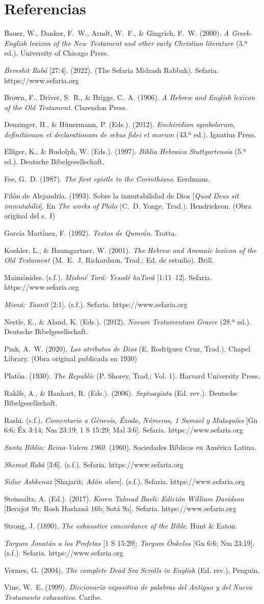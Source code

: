 \documentclass[11pt,letterpaper]{article}
\newcommand{\refapa}[1]{\par{\RaggedRight\hangindent=1.27cm\hangafter=1\noindent #1\par}\vspace{4pt}}
\begin{document}
\section*{Referencias}
\refapa{Bauer, W., Danker, F.~W., Arndt, W.~F., \& Gingrich, F.~W. (2000). \emph{A Greek-English lexicon of the New Testament and other early Christian literature} (3.ª ed.). University of Chicago Press.}
\refapa{\emph{Bereshit Rabá} [27:4]. (2022). (The Sefaria Midrash Rabbah). Sefaria. https://www.sefaria.org}
\refapa{Brown, F., Driver, S.~R., \& Briggs, C.~A. (1906). \emph{A Hebrew and English lexicon of the Old Testament}. Clarendon Press.}
\refapa{Denzinger, H., \& Hünermann, P. (Eds.). (2012). \emph{Enchiridion symbolorum, definitionum et declarationum de rebus fidei et morum} (43.ª ed.). Ignatius Press.}
\refapa{Elliger, K., \& Rudolph, W. (Eds.). (1997). \emph{Biblia Hebraica Stuttgartensia} (5.ª ed.). Deutsche Bibelgesellschaft.}
\refapa{Fee, G.~D. (1987). \emph{The first epistle to the Corinthians}. Eerdmans.}
\refapa{Filón de Alejandría. (1993). Sobre la inmutabilidad de Dios [\emph{Quod Deus sit immutabilis}]. En \emph{The works of Philo} (C.~D. Yonge, Trad.). Hendrickson. (Obra original del s.~I)}
\refapa{García Martínez, F. (1992). \emph{Textos de Qumrán}. Trotta.}
\refapa{Koehler, L., \& Baumgartner, W. (2001). \emph{The Hebrew and Aramaic lexicon of the Old Testament} (M.~E.~J. Richardson, Trad.; Ed. de estudio). Brill.}
\refapa{Maimónides. (s.f.). \emph{Mishné Torá: Yesodé haTorá} [1:11--12]. Sefaria. https://www.sefaria.org}
\refapa{\emph{Misná: Taanit} [2:1]. (s.f.). Sefaria. https://www.sefaria.org}
\refapa{Nestle, E., \& Aland, K. (Eds.). (2012). \emph{Novum Testamentum Graece} (28.ª ed.). Deutsche Bibelgesellschaft.}
\refapa{Pink, A.~W. (2020). \emph{Los atributos de Dios} (E. Rodríguez Cruz, Trad.). Chapel Library. (Obra original publicada en 1930)}
\refapa{Platón. (1930). \emph{The Republic} (P. Shorey, Trad.; Vol. 1). Harvard University Press.}
\refapa{Rahlfs, A., \& Hanhart, R. (Eds.). (2006). \emph{Septuaginta} (Ed. rev.). Deutsche Bibelgesellschaft.}
\refapa{Rashi. (s.f.). \emph{Comentario a Génesis, Éxodo, Números, 1 Samuel y Malaquías} [Gn 6:6; Éx 3:14; Nm 23:19; 1 S 15:29; Mal 3:6]. Sefaria. https://www.sefaria.org}
\refapa{\emph{Santa Biblia: Reina-Valera 1960}. (1960). Sociedades Bíblicas en América Latina.}
\refapa{\emph{Shemot Rabá} [3:6]. (s.f.). Sefaria. https://www.sefaria.org}
\refapa{\emph{Sidur Ashkenaz} [Shajarit; \emph{Adón olam}]. (s.f.). Sefaria. https://www.sefaria.org}
\refapa{Steinsaltz, A. (Ed.). (2017). \emph{Koren Talmud Bavli: Edición William Davidson} [Berajot 9b; Rosh Hashaná 16b; Sotá 9a]. Sefaria. https://www.sefaria.org}
\refapa{Strong, J. (1890). \emph{The exhaustive concordance of the Bible}. Hunt \& Eaton.}
\refapa{\emph{Targum Jonatán a los Profetas} [1 S 15:29]; \emph{Targum Ónkelos} [Gn 6:6; Nm 23:19]. (s.f.). Sefaria. https://www.sefaria.org}
\refapa{Vermes, G. (2004). \emph{The complete Dead Sea Scrolls in English} (Ed. rev.). Penguin.}
\refapa{Vine, W.~E. (1999). \emph{Diccionario expositivo de palabras del Antiguo y del Nuevo Testamento exhaustivo}. Caribe.}
\end{document}
